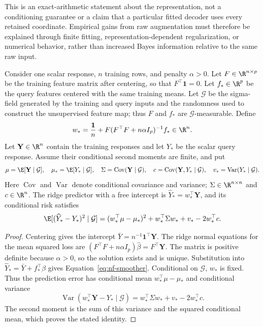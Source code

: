 This is an exact-arithmetic statement about the representation, not a
conditioning guarantee or a claim that a particular fitted decoder uses
every retained coordinate.  Empirical gains from raw augmentation must
therefore be explained through finite fitting, representation-dependent
regularization, or numerical behavior, rather than increased Bayes
information relative to the same raw input.

\begin{proposition}
\label{prop:nf-linear-risk}
Consider one scalar response, $n$ training rows, and penalty $\alpha>0$.
Let $F\in\R^{n\times p}$ be the training feature matrix after centering,
so that $F^\top\mathbf1=0$. Let $f_*\in\R^p$ be the query features
centered with the same training means. Let $\mathcal G$ be the
sigma-field generated by the training and query inputs and the
randomness used to construct the unsupervised feature map; thus $F$
and $f_*$ are $\mathcal G$-measurable. Define
\begin{equation}
 w_* = \frac{\mathbf1}{n}
       +F(F^\top F+n\alpha I_p)^{-1}f_*\in\R^n.
 \label{eq:nf-smoother}
\end{equation}
Let $\mathbf Y\in\R^n$ contain the training responses and let $Y_*$
be the scalar query response. Assume their conditional second moments
are finite, and put
\[
 \mu=\E[\mathbf Y\mid\mathcal G],\quad
 \mu_*=\E[Y_*\mid\mathcal G],\quad
 \Sigma=\operatorname{Cov}(\mathbf Y\mid\mathcal G),\quad
 c=\operatorname{Cov}(\mathbf Y,Y_*\mid\mathcal G),\quad
 v_*=\operatorname{Var}(Y_*\mid\mathcal G).
\]
Here $\operatorname{Cov}$ and $\operatorname{Var}$ denote conditional
covariance and variance; $\Sigma\in\R^{n\times n}$ and $c\in\R^n$.
The ridge predictor with a free intercept is $\widehat Y_*=w_*^\top\mathbf Y$,
and its conditional risk satisfies
\begin{equation}
 \E[(\widehat Y_*-Y_*)^2\mid\mathcal G]
   =(w_*^\top\mu-\mu_*)^2+w_*^\top\Sigma w_*+v_*-2w_*^\top c.
 \label{eq:nf-dependent-risk}
\end{equation}
\end{proposition}
\begin{proof}
Centering gives the intercept
$\bar Y=n^{-1}\mathbf1^\top\mathbf Y$. The ridge normal equations
for the mean squared loss are
$(F^\top F+n\alpha I_p)\widehat\beta=F^\top\mathbf Y$.
The matrix is positive definite because $\alpha>0$, so the solution
exists and is unique. Substitution into
$\widehat Y_*=\bar Y+f_*^\top\widehat\beta$ gives
Equation~\eqref{eq:nf-smoother}. Conditional on $\mathcal G$, $w_*$
is fixed. Thus the prediction error has conditional mean
$w_*^\top\mu-\mu_*$ and conditional variance
\[
 \operatorname{Var}(w_*^\top\mathbf Y-Y_*\mid\mathcal G)
 =w_*^\top\Sigma w_*+v_*-2w_*^\top c.
\]
The second moment is the sum of this variance and the squared
conditional mean, which proves the stated identity.
\end{proof}


